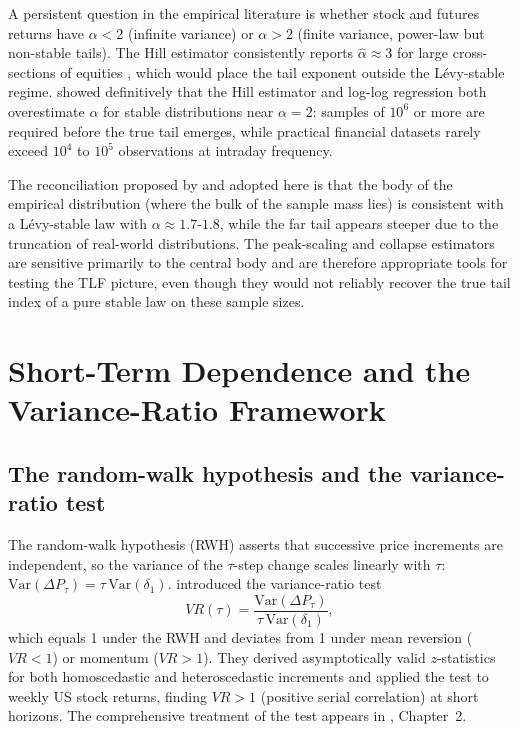 \documentclass[12pt,a4paper]{article}
\begin{document}
A persistent question in the empirical literature is whether stock and futures
returns have $\alpha < 2$ (infinite variance) or $\alpha > 2$ (finite variance,
power-law but non-stable tails). The Hill estimator consistently reports
$\hat\alpha \approx 3$ for large cross-sections of equities
\parencite{Gopikrishnan1999}, which would place the tail exponent outside the
Lévy-stable regime. \textcite{Weron2001} showed definitively that the Hill
estimator and log-log regression both overestimate $\alpha$ for stable
distributions near $\alpha = 2$: samples of $10^6$ or more are required before
the true tail emerges, while practical financial datasets rarely exceed $10^4$
to $10^5$ observations at intraday frequency.

The reconciliation proposed by \textcite{Weron2001} and adopted here is that
the body of the empirical distribution (where the bulk of the sample mass lies)
is consistent with a Lévy-stable law with $\alpha \approx 1.7$-$1.8$, while
the far tail appears steeper due to the truncation of real-world distributions.
The peak-scaling and collapse estimators are sensitive primarily to the central
body and are therefore appropriate tools for testing the TLF picture, even
though they would not reliably recover the true tail index of a pure stable law
on these sample sizes.


\section{Short-Term Dependence and the Variance-Ratio Framework}
\label{sec:vr}

\subsection{The random-walk hypothesis and the variance-ratio test}

The random-walk hypothesis (RWH) asserts that successive price increments are
independent, so the variance of the $\tau$-step change scales linearly with
$\tau$: $\mathrm{Var}(\Delta P_\tau) = \tau\,\mathrm{Var}(\delta_1)$.
\textcite{LoMacKinlay1988} introduced the variance-ratio test
\begin{equation}
  VR(\tau) = \frac{\mathrm{Var}(\Delta P_\tau)}{\tau\,\mathrm{Var}(\delta_1)},
  \label{eq:vr}
\end{equation}
which equals 1 under the RWH and deviates from 1 under mean reversion
($VR < 1$) or momentum ($VR > 1$). They derived asymptotically valid
$z$-statistics for both homoscedastic and heteroscedastic increments and
applied the test to weekly US stock returns, finding $VR > 1$ (positive serial
correlation) at short horizons. The comprehensive treatment of the test
appears in \textcite{CampbellLoMacKinlay1997}, Chapter~2.
\end{document}
